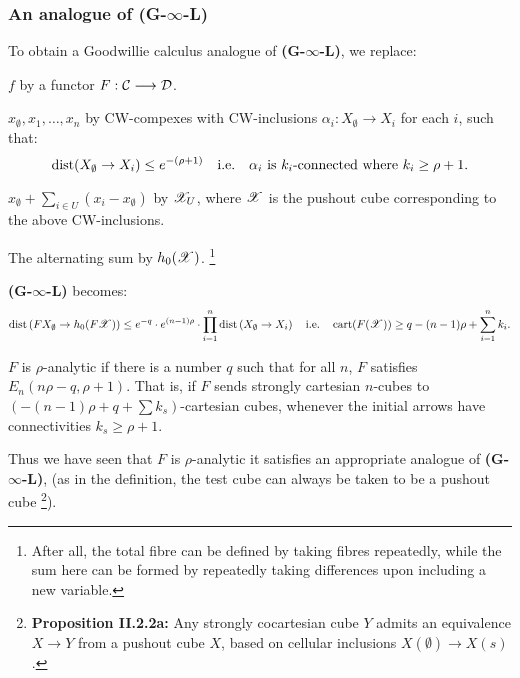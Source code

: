 \documentclass[11pt]{article}
\DeclareMathOperator{\dist}{dist}
\DeclareMathOperator{\cartesianness}{cart}
\begin{document}
\begin{Calculus II}
\subsubsection*{An analogue of (G-$\infty$-L)}
To obtain a Goodwillie calculus analogue of \textbf{(G-$\infty$-L)}, we replace:
\begin{itemise}
\item $f$ by a functor $F:\mathcal{C}\longrightarrow\mathcal{D}$.
\setlength{\parindent}{.25in}
\item $x_\emptyset,x_1,\ldots,x_n$ by CW-compexes with CW-inclusions $\alpha_i:X_\emptyset\rightarrow X_i$ for each $i$, such that:
\[\dist(X_\emptyset\rightarrow X_i)\leq e^{-(\rho+1)}\quad \textup{i.e.}\quad \textup{$\alpha_i$ is $k_i$-connected where $k_i\geq\rho+1$.}\]
\item $x_\emptyset+\sum_{i\in U}(x_i-x_\emptyset)$ by $\mathscr{X}_U$, where $\mathscr{X}$ is the pushout cube corresponding to the above CW-inclusions.
\item The alternating sum by $h_0(\mathscr{X})$.%
\footnote{After all, the total fibre can be defined by taking fibres repeatedly, while the sum here can be formed by repeatedly taking differences upon including a new variable.}
\end{itemise}
\textbf{\textup{(G-$\infty$-L)}} becomes:
\[\dist\left(FX_\emptyset\rightarrow h_0(F\scrX)\right)\leq e^{-q}\cdot e^{(n-1)\rho}
\cdot\prod_{i=1}^n \dist\left(X_\emptyset\rightarrow X_i\right)\quad \textup{i.e.}\quad \cartesianness(F(\scrx))\geq q-(n-1)\rho+\sum_{i=1}^nk_i.\]
%
\begin{defn*}
$F$ is $\rho$-analytic if there is a number $q$ such that for all $n$, $F$ satisfies $E_n(n\rho-q,\rho+1)$. That is, if $F$ sends strongly cartesian $n$-cubes to $(-(n-1)\rho+q+\sum k_s)$-cartesian cubes, whenever the initial arrows have connectivities $k_s\geq \rho+1$.
\end{defn*}
\noindent Thus we have seen that $F$ is $\rho$-analytic \Iff it satisfies an appropriate analogue of \textbf{\textup{(G-$\infty$-L)}}, (as in the definition, the test cube can always be taken to be a pushout cube%
\footnote{\textbf{Proposition II.2.2a:} 
Any strongly cocartesian cube $Y$ admits an equivalence $X\to Y$ from a pushout cube $X$, based on cellular inclusions $X(\emptyset)\to X(s)$.}).

\pagebreak


\end{Calculus II}
\end{document}
